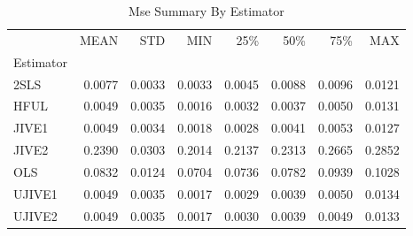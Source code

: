 \begin{table}[ht]
\centering
\caption{Mse Summary By Estimator}
\begin{tabular}{lrrrrrrr}
\toprule
 & MEAN & STD & MIN & 25\% & 50\% & 75\% & MAX \\
Estimator &  &  &  &  &  &  &  \\
\midrule
2SLS & 0.0077 & 0.0033 & 0.0033 & 0.0045 & 0.0088 & 0.0096 & 0.0121 \\
HFUL & 0.0049 & 0.0035 & 0.0016 & 0.0032 & 0.0037 & 0.0050 & 0.0131 \\
JIVE1 & 0.0049 & 0.0034 & 0.0018 & 0.0028 & 0.0041 & 0.0053 & 0.0127 \\
JIVE2 & 0.2390 & 0.0303 & 0.2014 & 0.2137 & 0.2313 & 0.2665 & 0.2852 \\
OLS & 0.0832 & 0.0124 & 0.0704 & 0.0736 & 0.0782 & 0.0939 & 0.1028 \\
UJIVE1 & 0.0049 & 0.0035 & 0.0017 & 0.0029 & 0.0039 & 0.0050 & 0.0134 \\
UJIVE2 & 0.0049 & 0.0035 & 0.0017 & 0.0030 & 0.0039 & 0.0049 & 0.0133 \\
\bottomrule
\end{tabular}
\end{table}
